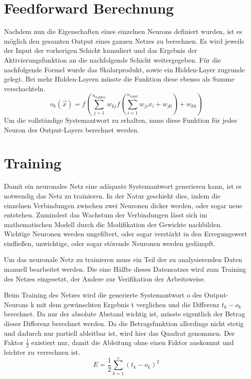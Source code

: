 \section{Feedforward Berechnung}
Nachdem nun die Eigenschaften eines einzelnen Neurons definiert wurden, ist es möglich den gesamten Output eines ganzen Netzes zu berechnen.  Es wird jeweils der Input der vorherigen Schicht kumuliert und das Ergebnis der Aktivierungsfunktion an die nachfolgende Schicht weitergegeben. Für die nachfolgende Formel wurde das Skalarprodukt, sowie ein Hidden-Layer zugrunde gelegt. Bei mehr Hidden-Layern müsste die Funktion diese ebenso als Summe verschachteln.
\begin{equation}
o_{k}(\vec{x})=f\left( \sum_{j=1}^{n_{hidden}} w_{kj} f\left(\sum_{i=1}^{n_{input}} w_{ji}x_{i}+w_{j0} \right)+w_{k0} \right)
\end{equation}
Um die vollständige Systemantwort zu erhalten, muss diese Funktion für jedes Neuron des Output-Layers berechnet werden.

\section{Training}

Damit ein neuronales Netz eine adäquate Systemantwort generieren kann, ist es notwendig das Netz zu trainieren. In der Natur geschieht dies, indem die einzelnen Verbindungen zwischen zwei Neuronen dicker werden, oder sogar neue entstehen. Zumindest das Wachstum der Verbindungen lässt sich im mathematischen Modell durch die Modifikation der Gewichte nachbilden. Wichtige Neuronen werden ungefiltert, oder sogar verstärkt in den Erregungswert einfließen, unwichtige, oder sogar störende Neuronen werden gedämpft.

Um das neuronale Netz zu trainieren muss ein Teil der zu analysierenden Daten manuell bearbeitet werden. Die eine Hälfte dieses Datensatzes wird zum Training des Netzes eingesetzt, der Andere zur Verifikation der Arbeitsweise.
 
Beim Training des Netzes wird die generierte Systemantwort o des Output-Neurons k mit dem gewünschten Ergebnis t verglichen und die Differenz $t_k - o_k$ berechnet. Da nur der absolute Abstand wichtig ist, müsste eigentlich der Betrag dieser Differenz berechnet werden. Da die Betragsfunktion allerdings nicht stetig und dadurch nur partiell ableitbar ist, wird hier das Quadrat genommen. Der Faktor $\frac{1}{2}$ existiert nur, damit die Ableitung ohne einen Faktor auskommt und leichter zu verrechnen ist.
\begin{equation}
E = \frac{1}{2} \sum_{k=1}^{c}(t_{k}-o_{k})^2
\end{equation}

